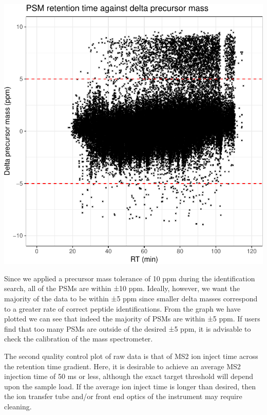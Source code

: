 \documentclass[9pt,a4paper,]{extarticle}
\begin{document}
\begin{center}\includegraphics[height=0.3\textheight]{workflow_expressions_files/figure-latex/tmt_mass_accuracy-1} \end{center}

Since we applied a precursor mass tolerance of 10 ppm during the identification
search, all of the PSMs are within ±10 ppm. Ideally, however, we want the
majority of the data to be within ±5 ppm since smaller delta masses correspond
to a greater rate of correct peptide identifications. From the graph we have
plotted we can see that indeed the majority of PSMs are within ±5 ppm. If users
find that too many PSMs are outside of the desired ±5 ppm, it is advisable to
check the calibration of the mass spectrometer.

The second quality control plot of raw data is that of MS2 ion inject time
across the retention time gradient. Here, it is desirable to achieve an average
MS2 injection time of 50 ms or less, although the exact target threshold will
depend upon the sample load. If the average ion inject time is longer than
desired, then the ion transfer tube and/or front end optics of the instrument may
require cleaning.
\end{document}
